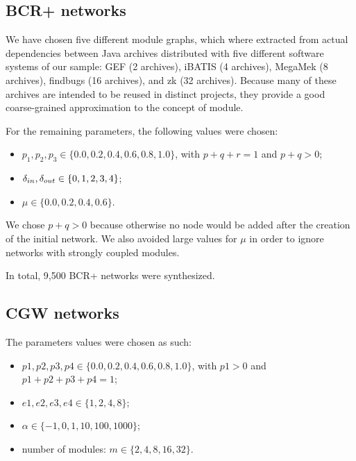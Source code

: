 \subsection{BCR+ networks}

We have chosen five different module graphs, which where extracted from actual
dependencies between Java archives distributed with five different software
systems of our sample: GEF (2 archives), iBATIS (4 archives), MegaMek (8
archives), findbugs (16 archives), and zk (32 archives). Because many of these
archives are intended to be reused in distinct projects, they provide a good
coarse-grained approximation to the concept of module.


For the remaining parameters, the following values were chosen:

\begin{itemize}
\item $p_1, p_2, p_3 \in \{0.0, 0.2, 0.4, 0.6, 0.8, 1.0\}$, with $p + q + r = 1$ and
$p + q > 0$;
\item $\delta_{in}, \delta_{out} \in \{0, 1, 2, 3, 4\}$;
\item $\mu \in \{0.0, 0.2, 0.4, 0.6\}$.
\end{itemize}

We chose $p + q > 0$ because otherwise no node would be added after the
creation of the initial network. We also avoided large values for $\mu$ in
order to ignore networks with strongly coupled modules. 

In total, 9,500 BCR+ networks were synthesized.

\subsection{CGW networks}

The parameters values were chosen as such:

\begin{itemize}
\item $p1, p2, p3, p4 \in \{0.0, 0.2, 0.4, 0.6, 0.8, 1.0\}$, with $p1 > 0$ and
$p1 + p2 + p3 + p4 = 1$;
\item $e1, e2, e3, e4 \in \{1, 2, 4, 8\}$;
\item $\alpha \in \{-1, 0, 1, 10, 100, 1000\}$;
\item number of modules: $m \in \{2, 4, 8, 16, 32\}$.
\end{itemize}

